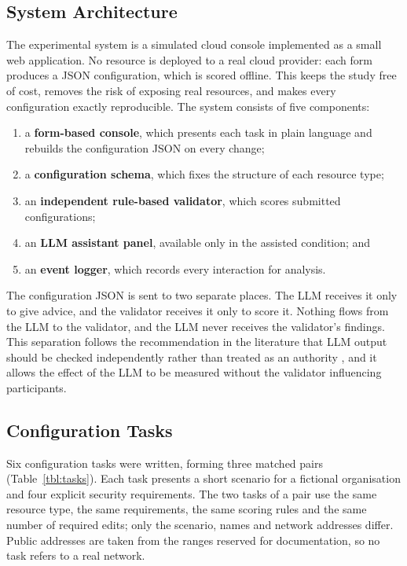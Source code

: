 \subsection{System Architecture}

The experimental system is a simulated cloud console implemented as a small web application. No resource is deployed to a real cloud provider: each form produces a JSON configuration, which is scored offline. This keeps the study free of cost, removes the risk of exposing real resources, and makes every configuration exactly reproducible. The system consists of five components:

\begin{enumerate}
    \item a \textbf{form-based console}, which presents each task in plain language and rebuilds the configuration JSON on every change;
    \item a \textbf{configuration schema}, which fixes the structure of each resource type;
    \item an \textbf{independent rule-based validator}, which scores submitted configurations;
    \item an \textbf{LLM assistant panel}, available only in the assisted condition; and
    \item an \textbf{event logger}, which records every interaction for analysis.
\end{enumerate}

The configuration JSON is sent to two separate places. The LLM receives it only to give advice, and the validator receives it only to score it. Nothing flows from the LLM to the validator, and the LLM never receives the validator's findings. This separation follows the recommendation in the literature that LLM output should be checked independently rather than treated as an authority \cite{minna2025,sajadi2025}, and it allows the effect of the LLM to be measured without the validator influencing participants.

\subsection{Configuration Tasks}

Six configuration tasks were written, forming three matched pairs (Table~\ref{tbl:tasks}). Each task presents a short scenario for a fictional organisation and four explicit security requirements. The two tasks of a pair use the same resource type, the same requirements, the same scoring rules and the same number of required edits; only the scenario, names and network addresses differ. Public addresses are taken from the ranges reserved for documentation, so no task refers to a real network.

